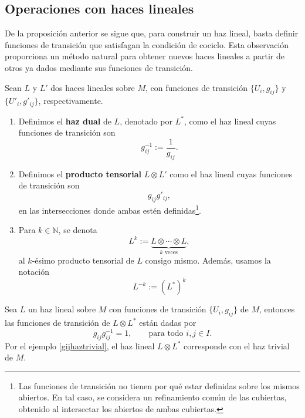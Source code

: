 \subsection{Operaciones con haces lineales}

	De la proposición anterior se sigue que, para construir un haz lineal, basta definir funciones de transición que satisfagan la condición de cociclo. Esta observación proporciona un método natural para obtener nuevos haces lineales a partir de otros ya dados mediante sus funciones de transición.

\begin{definition}
	Sean $L$ y $L'$ dos haces lineales sobre $M$, con funciones de transición $\{U_i,g_{ij}\}$ y $\{U'_i,g'_{ij}\}$, respectivamente.
	\begin{enumerate}
		\item Definimos el \textbf{haz dual} de $L$, denotado por $L^*$, como el haz lineal cuyas funciones de transición son
		\begin{equation*}
			g_{ij}^{-1}:=\frac{1}{g_{ij}}.
		\end{equation*}
		\item Definimos el \textbf{producto tensorial} $L\otimes L'$ como el haz lineal cuyas funciones de transición son
		\begin{equation*}
			g_{ij}g'_{ij},
		\end{equation*}
		en las intersecciones donde ambas estén definidas\footnote{Las funciones de transición no tienen por qué estar definidas sobre los mismos abiertos. En tal caso, se considera un refinamiento común de las cubiertas, obtenido al intersectar los abiertos de ambas cubiertas.}.
		
		\item Para $k\in \mathbb{N}$, se denota
		\begin{equation*}
			L^{k}:=\underbrace{L\otimes\cdots\otimes L}_{k\text{ veces}},
		\end{equation*}
		al $k$-ésimo producto tensorial de $L$ consigo mismo. Además, usamos la notación 
		\begin{equation*}
			L^{-k}:=(L^*)^k
		\end{equation*}
	\end{enumerate}
\end{definition}	

	
	
	\begin{example}\label{Ltensordual}
		Sea $L$ un haz lineal sobre $M$ con funciones de transición $\{U_i,g_{ij}\}$ de $M$, entonces las funciones de transición de $L\otimes L^*$ están dadas por
		\begin{equation*}
			g_{ij}g_{ij}^{-1}=1,\qquad\text{para todo }i,j\in I.
		\end{equation*}
		Por el ejemplo \ref{gijhaztrivial}, el haz lineal $L\otimes L^*$ corresponde con el haz trivial de $M$.
	\end{example}
	
